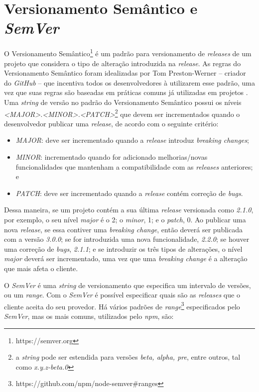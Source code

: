 \section{Versionamento Semântico e \textit{SemVer}}
\label{ref-teo:semver}

O Versionamento Semântico\footnote{https://semver.org} é um padrão para versionamento de \textit{releases} de um projeto que considera o tipo de alteração introduzida na \textit{release}. As regras do Versionamento Semântico foram idealizadas por Tom Preston-Werner -- criador do \textit{GitHub} -- que incentiva todos os desenvolvedores à utilizarem esse padrão, uma vez que suas regras são baseadas em práticas comuns já utilizadas em projetos \cite{teorical_reference:semver}. Uma \textit{string} de versão no padrão do Versionamento Semântico possui os níveis \textit{<MAJOR>.<MINOR>.<PATCH>}\footnote{a \textit{string} pode ser estendida para versões \textit{beta, alpha, pre}, entre outros, tal como \textit{x.y.z-beta.0}} que devem ser incrementados quando o desenvolvedor publicar uma \textit{release}, de acordo com o seguinte critério:

\begin{itemize}
    \item \textit{MAJOR}: deve ser incrementado quando a \textit{release} introduz \textit{breaking changes};
    \item \textit{MINOR}: incrementado quando for adicionado melhorias/novas funcionalidades que mantenham a compatibilidade com as \textit{releases} anteriores; e
    \item \textit{PATCH}: deve ser incrementado quando a \textit{release} contém correção de \textit{bugs}.
\end{itemize}{}

Dessa maneira, se um projeto contém a sua última \textit{release} versionada como \textit{2.1.0}, por exemplo, o seu nível \textit{major} é o 2; o \textit{minor}, 1; e o \textit{patch}, 0. Ao publicar uma nova \textit{release}, se essa contiver uma \textit{breaking change}, então deverá ser publicada com a versão \textit{3.0.0}; se for introduzida uma nova funcionalidade, \textit{2.2.0}; se houver uma correção de \textit{bugs}, \textit{2.1.1}; e se introduzir os três tipos de alterações, o nível \textit{major} deverá ser incrementado, uma vez que uma \textit{breaking change} é a alteração que mais afeta o cliente.

O \textit{SemVer} é uma \textit{string} de versionamento que especifica um intervalo de versões, ou um \textit{range}. Com o \textit{SemVer} é possível especificar quais são as \textit{releases} que o cliente aceita do seu provedor. Há vários padrões de \textit{range}\footnote{https://github.com/npm/node-semver\#ranges} especificados pelo \textit{SemVer}, mas os mais comuns, utilizados pelo \textit{npm}, são:

